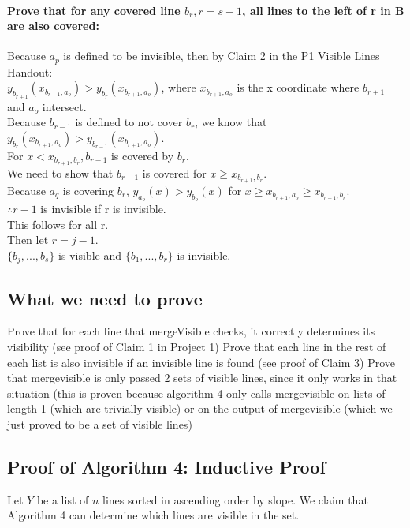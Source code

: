\documentclass{article}
\begin{document}
    \paragraph{Prove that for any covered line  $b_{r}, r = s - 1$, all lines to the left of r in B are also covered:}
        Because $a_p$ is defined to be invisible, then by Claim 2 in the P1 Visible Lines Handout:\\
        $y_{b_{r+1}}(x_{b_{r+1}, a_{o}}) > y_{b_{r}}(x_{b_{r+1},a_{o}})$, where $x_{b_{r+1}, a_{o}}$ is the x coordinate where $b_{r+1}$ and $a_o$ intersect.\\
        Because $b_{r-1}$ is defined to not cover $b_r$, we know that $y_{b_{r}}(x_{b_{r+1}, a_{o}}) > y_{b_{r-1}}(x_{b_{r+1},a_{o}})$.\\
        For $x < x_{b_{r+1},b_{r}}, b_{r-1}$ is covered by $b_r$.\\
        We need to show that $b_{r-1}$ is covered for $x \geq x_{b_{r+1},b_{r}}$.\\
        Because $a_q$ is covering $b_r$, $y_{a_{o}}(x) > y_{b_{o}}(x)$ for $x \geq x_{b_{r+1},a_{o}} \geq x_{b_{r+1},b_{r}}$.\\
        $\therefore r-1$ is invisible if r is invisible.\\
        This follows for all r.\\
        Then let $r = j - 1$.\\
        \therefore $\{b_j,...,b_s\}$ is visible and $\{b_1,...,b_{r}\}$ is invisible.\\


\subsection*{What we need to prove}
    Prove that for each line that mergeVisible checks, it correctly determines its visibility (see proof of Claim 1 in Project 1)
    Prove that each line in the rest of each list is also invisible if an invisible line is found (see proof of Claim 3)
    Prove that mergevisible is only passed 2 sets of visible lines, since it only works in that situation (this is proven because algorithm 4 only calls mergevisible on lists of length 1 (which are trivially visible) or on the output of mergevisible (which we just proved to be a set of visible lines)

\subsection*{Proof of Algorithm 4: Inductive Proof}
    Let $Y$ be a list of $n$ lines sorted in ascending order by slope. We claim that Algorithm 4 can determine which lines are visible in the set.
\end{document}

